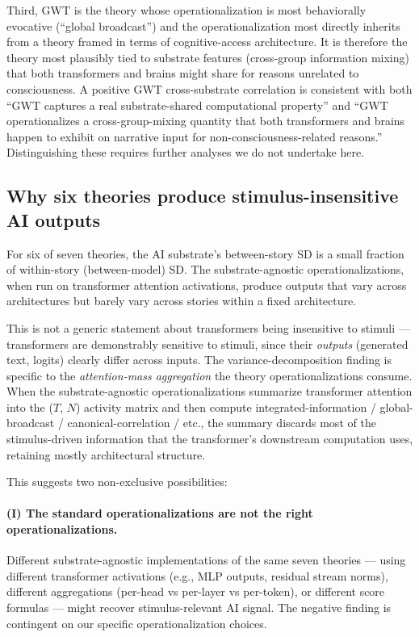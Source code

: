 \documentclass[11pt,a4paper]{article}
\begin{document}
Third, GWT is the theory whose operationalization is most behaviorally evocative (``global broadcast'') and the operationalization most directly inherits from a theory framed in terms of cognitive-access architecture. It is therefore the theory most plausibly tied to substrate features (cross-group information mixing) that both transformers and brains might share for reasons unrelated to consciousness. A positive GWT cross-substrate correlation is consistent with both ``GWT captures a real substrate-shared computational property'' and ``GWT operationalizes a cross-group-mixing quantity that both transformers and brains happen to exhibit on narrative input for non-consciousness-related reasons.'' Distinguishing these requires further analyses we do not undertake here.

\subsection{Why six theories produce stimulus-insensitive AI outputs}
\label{sec:discussion-six}

For six of seven theories, the AI substrate's between-story SD is a small fraction of within-story (between-model) SD. The substrate-agnostic operationalizations, when run on transformer attention activations, produce outputs that vary across architectures but barely vary across stories within a fixed architecture.

This is not a generic statement about transformers being insensitive to stimuli --- transformers are demonstrably sensitive to stimuli, since their \emph{outputs} (generated text, logits) clearly differ across inputs. The variance-decomposition finding is specific to the \emph{attention-mass aggregation} the theory operationalizations consume. When the substrate-agnostic operationalizations summarize transformer attention into the ($T$, $N$) activity matrix and then compute integrated-information / global-broadcast / canonical-correlation / etc., the summary discards most of the stimulus-driven information that the transformer's downstream computation uses, retaining mostly architectural structure.

This suggests two non-exclusive possibilities:

\paragraph{(I) The standard operationalizations are not the right operationalizations.} Different substrate-agnostic implementations of the same seven theories --- using different transformer activations (e.g., MLP outputs, residual stream norms), different aggregations (per-head vs per-layer vs per-token), or different score formulas --- might recover stimulus-relevant AI signal. The negative finding is contingent on our specific operationalization choices.
\end{document}
